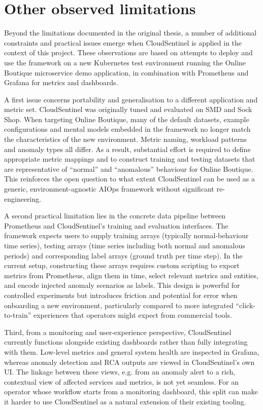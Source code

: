 \section{Other observed limitations}
Beyond the limitations documented in the original thesis, a number of additional constraints and practical issues emerge when CloudSentinel is applied in the context of this project. These observations are based on attempts to deploy and use the framework on a new Kubernetes test environment running the Online Boutique microservice demo application, in combination with Prometheus and Grafana for metrics and dashboards.

A first issue concerns portability and generalisation to a different application and metric set. CloudSentinel was originally tuned and evaluated on SMD and Sock Shop. When targeting Online Boutique, many of the default datasets, example configurations and mental models embedded in the framework no longer match the characteristics of the new environment. Metric naming, workload patterns and anomaly types all differ. As a result, substantial effort is required to define appropriate metric mappings and to construct training and testing datasets that are representative of “normal” and “anomalous” behaviour for Online Boutique. This reinforces the open question to what extent CloudSentinel can be used as a generic, environment-agnostic AIOps framework without significant re-engineering.

A second practical limitation lies in the concrete data pipeline between Prometheus and CloudSentinel’s training and evaluation interfaces. The framework expects users to supply training arrays (typically normal-behaviour time series), testing arrays (time series including both normal and anomalous periods) and corresponding label arrays (ground truth per time step). In the current setup, constructing these arrays requires custom scripting to export metrics from Prometheus, align them in time, select relevant metrics and entities, and encode injected anomaly scenarios as labels. This design is powerful for controlled experiments but introduces friction and potential for error when onboarding a new environment, particularly compared to more integrated “click-to-train” experiences that operators might expect from commercial tools.

Third, from a monitoring and user-experience perspective, CloudSentinel currently functions alongside existing dashboards rather than fully integrating with them. Low-level metrics and general system health are inspected in Grafana, whereas anomaly detection and RCA outputs are viewed in CloudSentinel’s own UI. The linkage between these views, e.g. from an anomaly alert to a rich, contextual view of affected services and metrics, is not yet seamless. For an operator whose workflow starts from a monitoring dashboard, this split can make it harder to use CloudSentinel as a natural extension of their existing tooling.

